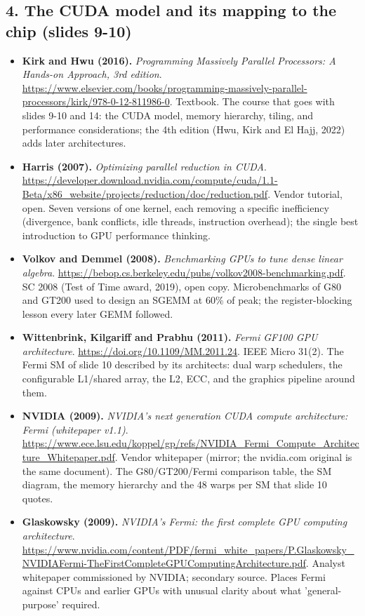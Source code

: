 \subsection*{4. The CUDA model and its mapping to the chip (slides 9-10)}
\begin{itemize}[leftmargin=1.2em,itemsep=3pt]\sloppy
\item \textbf{Kirk and Hwu (2016).} \textit{Programming Massively Parallel Processors: A Hands-on Approach, 3rd edition}. \url{https://www.elsevier.com/books/programming-massively-parallel-processors/kirk/978-0-12-811986-0}. Textbook. The course that goes with slides 9-10 and 14: the CUDA model, memory hierarchy, tiling, and performance considerations; the 4th edition (Hwu, Kirk and El Hajj, 2022) adds later architectures.
\item \textbf{Harris (2007).} \textit{Optimizing parallel reduction in CUDA}. \url{https://developer.download.nvidia.com/compute/cuda/1.1-Beta/x86_website/projects/reduction/doc/reduction.pdf}. Vendor tutorial, open. Seven versions of one kernel, each removing a specific inefficiency (divergence, bank conflicts, idle threads, instruction overhead); the single best introduction to GPU performance thinking.
\item \textbf{Volkov and Demmel (2008).} \textit{Benchmarking GPUs to tune dense linear algebra}. \url{https://bebop.cs.berkeley.edu/pubs/volkov2008-benchmarking.pdf}. SC 2008 (Test of Time award, 2019), open copy. Microbenchmarks of G80 and GT200 used to design an SGEMM at 60\% of peak; the register-blocking lesson every later GEMM followed.
\item \textbf{Wittenbrink, Kilgariff and Prabhu (2011).} \textit{Fermi GF100 GPU architecture}. \url{https://doi.org/10.1109/MM.2011.24}. IEEE Micro 31(2). The Fermi SM of slide 10 described by its architects: dual warp schedulers, the configurable L1/shared array, the L2, ECC, and the graphics pipeline around them.
\item \textbf{NVIDIA (2009).} \textit{NVIDIA's next generation CUDA compute architecture: Fermi (whitepaper v1.1)}. \url{https://www.ece.lsu.edu/koppel/gp/refs/NVIDIA_Fermi_Compute_Architecture_Whitepaper.pdf}. Vendor whitepaper (mirror; the nvidia.com original is the same document). The G80/GT200/Fermi comparison table, the SM diagram, the memory hierarchy and the 48 warps per SM that slide 10 quotes.
\item \textbf{Glaskowsky (2009).} \textit{NVIDIA's Fermi: the first complete GPU computing architecture}. \url{https://www.nvidia.com/content/PDF/fermi_white_papers/P.Glaskowsky_NVIDIAFermi-TheFirstCompleteGPUComputingArchitecture.pdf}. Analyst whitepaper commissioned by NVIDIA; secondary source. Places Fermi against CPUs and earlier GPUs with unusual clarity about what 'general-purpose' required.
\end{itemize}
